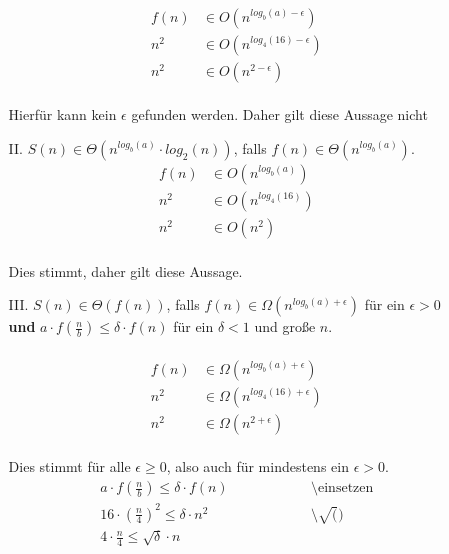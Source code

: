 \documentclass{article}
\begin{document}
\begin{enumerate}
\begin{enumerate}
    	    \\
    	    \[
    	        \begin{array}{ll}
    	            f(n) &\in O(n^{log_b(a)- \epsilon})\\
    	            n^2 &\in O(n^{log_4(16)- \epsilon})\\
    	            n^2 &\in O(n^{2- \epsilon})
    	        \end{array}
    	    \]
    	    \\
    	    Hierfür kann kein $\epsilon$ gefunden werden. Daher gilt diese Aussage nicht\\
    	    \item[II.]
    	    $S(n) \in \Theta (n^{log_b(a)} \cdot log_2(n))$, falls $f(n) \in \Theta (n^{log_b(a)})$.\\
    	    \[
    	        \begin{array}{ll}
    	            f(n) &\in O(n^{log_b(a)})\\
    	            n^2 &\in O(n^{log_4(16)})\\
    	            n^2 &\in O(n^2)
    	        \end{array}
    	    \]
    	    \\
    	    Dies stimmt, daher gilt diese Aussage.
    	    \item[III.]
    	    $S(n) \in \Theta (f(n))$, falls $f(n) \in \Omega (n^{log_b(a)+ \epsilon})$ für ein $\epsilon > 0$ \textbf{und} $a \cdot f(\frac{n}{b}) \leq \delta \cdot f(n)$ für ein $\delta < 1$ und große $n$.\\
    	    \\
    	    \[
    	        \begin{array}{ll}
    	            f(n) &\in \Omega (n^{log_b(a)+ \epsilon})\\
    	            n^2 &\in \Omega (n^{log_4(16)+ \epsilon})\\
    	            n^2 &\in \Omega (n^{2+ \epsilon})
    	        \end{array}
    	    \]
    	    \\
    	    Dies stimmt für alle $\epsilon \geq 0$, also auch für mindestens ein $\epsilon > 0$.
    	    \[
    	        \begin{array}{lll}
    	            a \cdot f(\frac{n}{b}) \leq \delta \cdot f(n)~~~~~~~~~~~~~~~~~~~~~~~&\text{\textbackslash einsetzen}\\
    	            16 \cdot (\frac{n}{4})^2 \leq \delta \cdot n^2 &\text{\textbackslash $\sqrt()$}\\
    	            4 \cdot \frac{n}{4} \leq \sqrt{\delta} \cdot n\\

\end{array}\]
\end{enumerate}
\end{enumerate}
\end{document}

